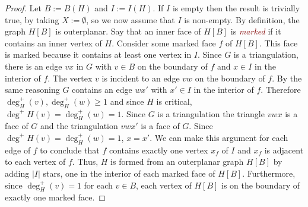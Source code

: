 \documentclass[12pt]{article}
\newcommand{\defin}[1]{\emph{\textcolor{Maroon}{#1}}}
\begin{document}
\begin{proof}
  Let $B:=B(H)$ and $I:=I(H)$.  If $I$ is empty then the result is trivially true, by taking $X:=\emptyset$, so we now assume that $I$ is non-empty.  By definition, the graph $H[B]$ is outerplanar.  Say that an inner face of $H[B]$ is \defin{marked} if it contains an inner vertex of $H$.  Consider some marked face $f$ of $H[B]$.  This face is marked because it contains at least one vertex in $I$.  Since $G$ is a triangulation, there is an edge $vx$ in $G$ with $v\in B$ on the boundary of $f$ and $x\in I$ in the interior of $f$.  The vertex $v$ is incident to an edge $vw$ on the boundary of $f$. By the same reasoning $G$ contains an edge $wx'$ with $x'\in I$ in the interior of $f$.  Therefore $\deg^+_H(v),\deg^+_H(w)\ge 1$ and since $H$ is critical, $\deg^+H(v)=\deg^+_H(w)=1$.  Since $G$ is a triangulation the triangle $vwx$ is a face of $G$ and the triangulation $vwx'$ is a face of $G$.  Since $\deg^+H(v)=\deg^+_H(w)=1$, $x=x'$.  We can make this argument for each edge of $f$ to conclude that $f$ contains exactly one vertex $x_f$ of $I$ and $x_f$ is adjacent to each vertex of $f$.  Thus, $H$ is formed from an outerplanar graph $H[B]$ by adding $|I|$ stars, one in the interior of each marked face of $H[B]$.  Furthermore, since $\deg_H^+(v)=1$ for each $v\in B$, each vertex of $H[B]$ is on the boundary of exactly one marked face.


\end{proof}
\end{document}
